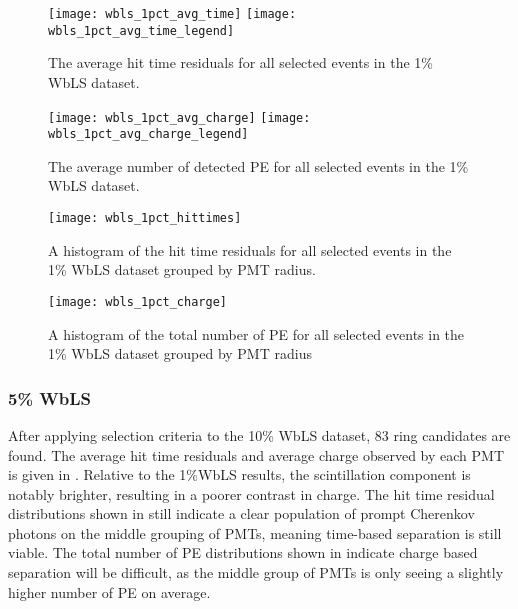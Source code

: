 \begin{figure}
\centering
\texttt{[image: wbls\_1pct\_avg\_time]}
\texttt{[image: wbls\_1pct\_avg\_time\_legend]}
\caption{\label{fig:wbls1pct_avg_time}The average hit time residuals for all selected events in the 1\% WbLS dataset.}
\end{figure}

\begin{figure}
\centering
\texttt{[image: wbls\_1pct\_avg\_charge]}
\texttt{[image: wbls\_1pct\_avg\_charge\_legend]}
\caption{\label{fig:wbls1pct_avg_charge}The average number of detected PE for all selected events in the 1\% WbLS dataset.}
\end{figure}

\begin{figure}
\centering
\texttt{[image: wbls\_1pct\_hittimes]}
\caption{\label{fig:wbls1pct_tresid}A histogram of the hit time residuals for all selected events in the 1\% WbLS dataset grouped by PMT radius.}
\end{figure}

\begin{figure}
\centering
\texttt{[image: wbls\_1pct\_charge]}
\caption{\label{fig:wbls1pct_totalq}A histogram of the total number of PE for all selected events in the 1\% WbLS dataset grouped by PMT radius}
\end{figure}

\clearpage

\subsubsection{5\% WbLS}

After applying selection criteria to the 10\% WbLS dataset, 83 ring candidates are found.
The average hit time residuals and average charge observed by each PMT is given in .
Relative to the 1\%WbLS results, the scintillation component is notably brighter, resulting in a poorer contrast in charge.
The hit time residual distributions shown in  still indicate a clear population of prompt Cherenkov photons on the middle grouping of PMTs, meaning time-based separation is still viable.
The total number of PE distributions shown in  indicate charge based separation will be difficult, as the middle group of PMTs is only seeing a slightly higher number of PE on average.


